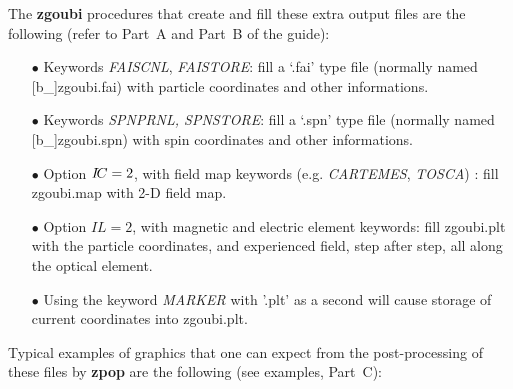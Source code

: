 \noindent The \textbf{zgoubi} procedures that create and fill these extra output 
files are the following (refer to Part~A and Part~B of the 
guide):

\begin{itemize}
  \item[$\bullet$] Keywords \textsl{FAISCNL}, \textsl{FAISTORE}:
   fill a `.fai' type file (normally 
  named [b\_]zgoubi.fai) with particle 
coordinates and other informations. 

  \item[$\bullet$] Keywords \textsl{SPNPRNL, SPNSTORE}:
   fill  a `.spn' type file (normally 
  named [b\_]zgoubi.spn)  with spin 
coordinates and other informations. 

 \item[$\bullet$] Option $I\!C=2$, with field map keywords (e.g. 
 \textsl{CARTEMES}, 
\textsl{TOSCA}) : fill  zgoubi.map  with 2-D field map. 

  \item[$\bullet$] Option $IL=2$, with magnetic and electric element 
keywords: fill zgoubi.plt with the particle coordinates, and 
experienced field, step after step, all along the optical 
element.

  \item[$\bullet$] Using the keyword \textsl{MARKER}  
with '.plt' as a second \LABEL {} will cause storage of current coordinates into zgoubi.plt. 


\end{itemize}

\noindent Typical examples of graphics that one can expect from the 
post-processing of these files by \textbf{zpop}
are the following (see examples, Part~C):

